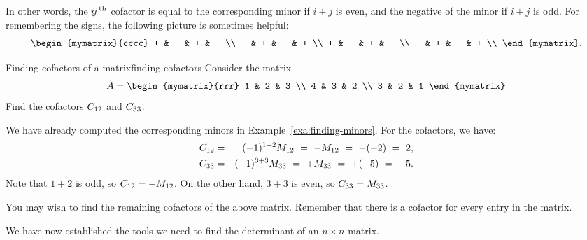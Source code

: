 In other words, the $\ijth$ cofactor is equal to the corresponding
minor if $i+j$ is even, and the negative of the minor if $i+j$ is
odd. For remembering the signs, the following picture is sometimes
helpful:
\begin{equation*}
  \begin{mymatrix}{cccc}
    + & - & + & - \\
    - & + & - & + \\
    + & - & + & - \\
    - & + & - & + \\
  \end{mymatrix}.
\end{equation*}

\begin{example}{Finding cofactors of a matrix}{finding-cofactors}
  Consider the matrix
  \begin{equation*}
    A=\begin{mymatrix}{rrr}
      1 & 2 & 3 \\
      4 & 3 & 2 \\
      3 & 2 & 1
    \end{mymatrix}
  \end{equation*}
  Find the cofactors $\cofactor{A}{12}$ and $\cofactor{A}{33}$.
\end{example}

\begin{solution}
  We have already computed the corresponding minors in
  Example~\ref{exa:finding-minors}. For the cofactors, we have:
  \begin{eqnarray*}
    \cofactor{A}{12} &=& (-1)^{1+2}\minor{A}{12} ~=~ -\minor{A}{12} ~=~ -(-2) ~=~ 2,\\
    \cofactor{A}{33} &=& (-1)^{3+3}\minor{A}{33} ~=~ +\minor{A}{33} ~=~ +(-5) ~=~ -5.\\
  \end{eqnarray*}
  Note that $1+2$ is odd, so $\cofactor{A}{12}=-\minor{A}{12}$. On the
  other hand, $3+3$ is even, so $\cofactor{A}{33}=\minor{A}{33}$.
\end{solution}

You may wish to find the remaining cofactors of the above
matrix. Remember that there is a cofactor for every entry in the
matrix.

We have now established the tools we need to find the determinant of
an $n\times n$-matrix.

